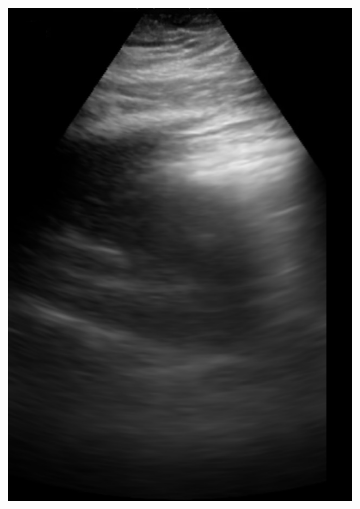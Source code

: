 \documentclass[11pt]{article} %
\begin{document}
	\begin{figure}
	\centering
		\begin{subfigure}{0.3\textwidth}
		\centering
		\includegraphics[width=\textwidth]{figuras/centroid_0.jpg}
		\end{subfigure}
		\begin{subfigure}{0.3\textwidth}
		\centering

\end{subfigure}
\end{figure}
\end{document}
